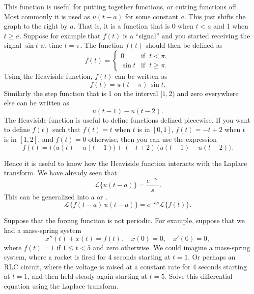 \documentclass{ximera}
\begin{document}
This function is useful for putting together functions, or cutting functions off.  Most commonly it is used as $u(t-a)$ for some constant $a$.  This just shifts the graph to the right by $a$.  That is, it is a function that is 0 when $t < a$ and 1 when $t \geq a$.  Suppose for example that $f(t)$ is a ``signal'' and you started receiving the signal $\sin t$ at time $t=\pi$.  The function $f(t)$ should then be defined as
\begin{equation*}
    f(t) =
    \begin{cases}
        0 & \text{if } \; t < \pi , \\ 
        \sin t & \text{if } \; t \geq \pi .
    \end{cases}
\end{equation*}
Using the Heaviside function, $f(t)$ can be written as
\begin{equation*}
    f(t) = u(t - \pi) \, \sin t .
\end{equation*}
Similarly the step function that is 1 on the interval $[1,2)$ and zero everywhere else can be written as
\begin{equation*}
    u(t - 1) - u(t-2) .
\end{equation*}
The Heaviside function is useful to define functions defined piecewise.  If you want to define $f(t)$ such that $f(t) = t$ when $t$ is in $[0,1]$, $f(t) = -t+2$ when $t$ is in $[1,2]$, and $f(t) = 0$ otherwise, then you can use the expression
\begin{equation*}
    f(t) = t \, \bigl( u(t) - u(t-1) \bigr) + (-t+2) \, \bigl( u(t - 1) - u(t-2) \bigr) .
\end{equation*}

Hence it is useful to know how the Heaviside function interacts with the Laplace transform.  We have already seen that
\begin{equation*}
    \mathcal{L} \bigl\{ u(t-a) \bigr\} = \frac{e^{-as}}{s} .
\end{equation*}
This can be generalized into a \emph{} or \emph{}.
\begin{equation} \label{ltd:sseq}
    \mathcal{L} \bigl\{ f(t-a) \, u(t-a) \bigr\} = e^{-as} \mathcal{L} \bigl\{ f(t) \bigr\} .
\end{equation}

\begin{example} \label{lt:rocketex}
    Suppose that the forcing function is not periodic.  For example, suppose that we had a mass-spring system
    \begin{equation*}
        x''(t) + x(t) = f(t) , \quad x(0) = 0, \quad x'(0) = 0,
    \end{equation*}
    where $f(t) = 1$ if $1 \leq t < 5$ and zero otherwise.  We could imagine a mass-spring system, where a rocket is fired for 4 seconds starting at $t=1$.  Or perhaps an RLC circuit, where the voltage is raised at a constant rate for 4 seconds starting at $t=1$, and then held steady again starting at $t=5$. Solve this differential equation using the Laplace transform.
\end{example}
\end{document}
